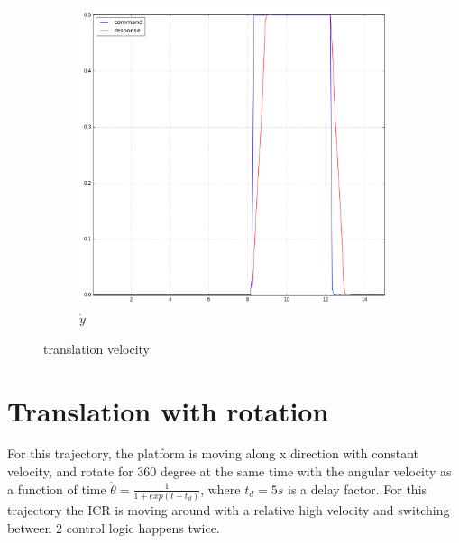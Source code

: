 \begin{figure}[!hb]
\begin{subfigure}[b]{0.49\textwidth}
         \includegraphics[width=1.1\textwidth]{Figures/90_y.png}
         \caption{$\dot{y}$}
         \label{fig:90Y}
     \end{subfigure}
     
        \caption{translation velocity}
        \label{fig:90}
\end{figure}



\section{Translation with rotation}
For this trajectory, the platform is moving along x direction with constant velocity, and rotate for 360 degree at the same time with the angular velocity as a function of time $\dot{\theta}=\frac{1}{1+exp(t-t_d)}$, where $t_d=5s$ is a delay factor. For this trajectory the ICR is moving around with a relative high velocity and switching between 2 control logic happens twice.

